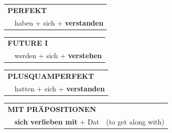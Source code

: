 \documentclass[10pt,a4paper]{revtex4-2}
\begin{document}
\begin{verbbox-acc}
    \vspace{10pt}

 \begin{tabular}{rl}
     \multicolumn{2}{l}{\textbf{PERFEKT}}\\
    &haben + sich + \textbf{verstanden}\\
  \end{tabular}
\hfill
   \begin{tabular}{rl}
   
    \multicolumn{2}{l}{\textbf{FUTURE I} }\\
    &werden + sich + \textbf{verstehen}\\
 
  \end{tabular}
\hfill
   \begin{tabular}{rl}
      \multicolumn{2}{l}{\textbf{PLUSQUAMPERFEKT}}\\
    &hatten + sich + \textbf{verstanden}\\
  \end{tabular}
  
\vspace{10pt}

   \begin{tabular}{lll}
      \multicolumn{3}{l}{\textbf{MIT PRÄPOSITIONEN}}\\
& \textbf{sich verlieben mit} + Dat & (to get along with)
  \end{tabular}
  
  \vspace{-5pt}

\end{verbbox-acc}
\end{document}
